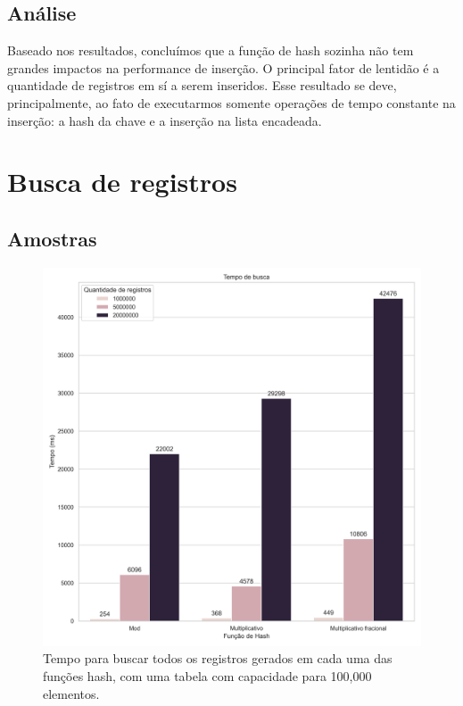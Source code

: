 \documentclass[12pt]{article}
\begin{document}
\newpage
\subsection{Análise}
Baseado nos resultados, concluímos que a função de hash sozinha não tem grandes impactos na performance de inserção. O principal fator de lentidão é a quantidade de registros em sí a serem inseridos.
Esse resultado se deve, principalmente, ao fato de executarmos somente operações de tempo constante na inserção: a hash da chave e a inserção na lista encadeada.

\newpage
\section{Busca de registros}

\subsection{Amostras}

\begin{figure}[ht]
\centering
\includegraphics[width=\textwidth,height=\textheight,keepaspectratio]{figures/LookupRuntime_100000.png}
\caption{Tempo para buscar todos os registros gerados em cada uma das funções hash, com uma tabela com capacidade para 100,000 elementos.}
\end{figure}
\end{document}
